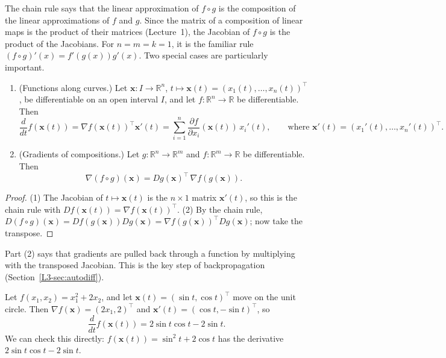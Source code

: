 The chain rule says that the linear approximation of $f \circ g$ is the composition of the linear approximations of $f$ and $g$. Since the matrix of a composition of linear maps is the product of their matrices (Lecture~1), the Jacobian of $f \circ g$ is the product of the Jacobians. For $n = m = k = 1$, it is the familiar rule $(f \circ g)'(x) = f'(g(x)) g'(x)$. Two special cases are particularly important.

\begin{corollary}\label{L3-cor:chain-special}
    \begin{enumerate}
        \item (Functions along curves.) Let $\mathbf{x}: I \to \mathbb{R}^n$, $t \mapsto \mathbf{x}(t) = (x_1(t), \ldots, x_n(t))^\top$, be differentiable on an open interval $I$, and let $f: \mathbb{R}^n \to \mathbb{R}$ be differentiable. Then
        \[\frac{d}{dt} f(\mathbf{x}(t)) = \nabla f(\mathbf{x}(t))^\top \mathbf{x}'(t) = \sum_{i=1}^n \frac{\partial f}{\partial x_i}(\mathbf{x}(t)) \, x_i'(t), \qquad \text{where } \mathbf{x}'(t) = (x_1'(t), \ldots, x_n'(t))^\top.\]
        \item (Gradients of compositions.) Let $g: \mathbb{R}^n \to \mathbb{R}^m$ and $f: \mathbb{R}^m \to \mathbb{R}$ be differentiable. Then
        \[\nabla (f \circ g)(\mathbf{x}) = Dg(\mathbf{x})^\top \, \nabla f(g(\mathbf{x})).\]
    \end{enumerate}
\end{corollary}

\begin{proof}
    (1) The Jacobian of $t \mapsto \mathbf{x}(t)$ is the $n \times 1$ matrix $\mathbf{x}'(t)$, so this is the chain rule with $D f(\mathbf{x}(t)) = \nabla f(\mathbf{x}(t))^\top$. (2) By the chain rule, $D(f \circ g)(\mathbf{x}) = Df(g(\mathbf{x})) Dg(\mathbf{x}) = \nabla f(g(\mathbf{x}))^\top Dg(\mathbf{x})$; now take the transpose.
\end{proof}

Part (2) says that gradients are pulled back through a function by multiplying with the transposed Jacobian. This is the key step of backpropagation (Section~\ref{L3-sec:autodiff}).

\begin{example}\label{L3-ex:chain-curve}
    Let $f(x_1, x_2) = x_1^2 + 2x_2$, and let $\mathbf{x}(t) = (\sin t, \cos t)^\top$ move on the unit circle. Then $\nabla f(\mathbf{x}) = (2x_1, 2)^\top$ and $\mathbf{x}'(t) = (\cos t, -\sin t)^\top$, so
    \[\frac{d}{dt} f(\mathbf{x}(t)) = 2\sin t \cos t - 2\sin t.\]
    We can check this directly: $f(\mathbf{x}(t)) = \sin^2 t + 2\cos t$ has the derivative $2\sin t \cos t - 2\sin t$.
\end{example}


